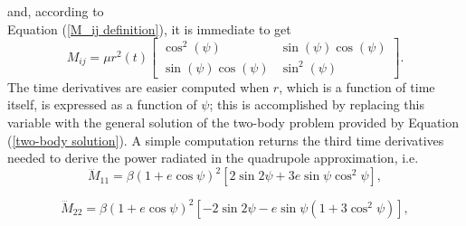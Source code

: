 \documentclass[12pt,twoside,openany]{book}
\begin{document}
and, according to \\Equation (\ref{M_ij definition}), it is immediate to get
\begin{equation}
M_{ij} = \mu r^2(t)\begin{bmatrix}
\cos^2(\psi) & \sin{(\psi)\cos(\psi)} \\
\sin{(\psi)\cos(\psi)} & \sin^2(\psi)
\end{bmatrix}.
\end{equation}
The time derivatives are easier computed when $r$, which is a function of time itself, is expressed as a function of $\psi$; this is accomplished by replacing this variable with the general solution of the two-body problem provided by Equation (\ref{two-body solution}). A simple computation returns the third time derivatives needed to derive the power radiated in the quadrupole approximation, i.e.
\begin{equation}\label{d3M _11/dt3}  
\dddot{M}_{11} = \beta (1 + e \cos \psi)^2 \left[ 2 \sin 2\psi + 3e \sin \psi \cos^2 \psi \right],
\end{equation}

\begin{equation}\label{d3M _22/dt3}  
    \dddot{M}_{22} = \beta (1 + e \cos \psi)^2 \left[ -2 \sin 2\psi - e \sin \psi (1 + 3 \cos^2 \psi) \right],
\end{equation}
\end{document}

